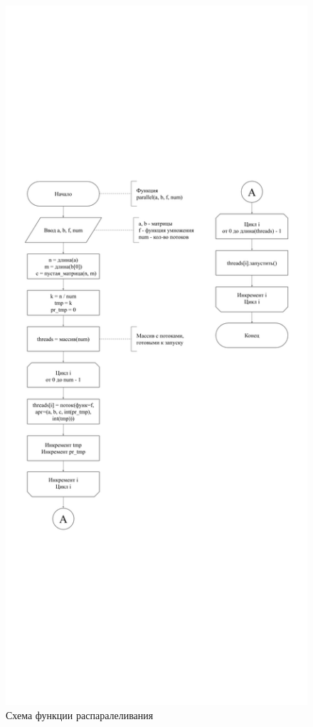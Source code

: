 \documentclass[../main.tex]{subfiles}
\begin{document}
	\begin{figure}[H]
		\centering
		\includegraphics[scale=0.3]{"img/parallel function"}
		\caption[Схема функции распаралеливания]{Схема функции распаралеливания}
		\label{fig:parallel-function}
	\end{figure}
	
\end{document}

